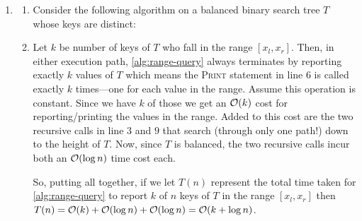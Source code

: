 \documentclass{article}
\begin{document}
\begin{enumerate}[leftmargin={*}, font={\bf}, label={\arabic*.}, ref={\arabic*}]
  \item \label{qst:3}
    \begin{enumerate}
      \item \label{qst:3a}
        Consider the following algorithm on a balanced binary search tree $T$ whose keys are distinct:
        \vspace{-\baselineskip}
        
        \begin{minipage}{\linewidth}
          \begin{algorithm}[H]
            \caption{$\textsc{Range-Query}(v,x_l,x_r)$}\label{alg:range-query}
            \begin{algorithmic}[1]
                  \State {} 
                \EndIf
                  \State {}
                \EndIf
                  \State {} 
                \EndIf
              \EndIf
            \end{algorithmic}
          \end{algorithm}
        \end{minipage}

      \item \label{qst:3b}
        Let $k$ be number of keys of $T$ who fall in the range $[x_l, x_r]$. Then, in either
        execution path, \autoref{alg:range-query} always terminates by reporting exactly $k$
        values of $T$ which means the \textsc{Print} statement in line $6$ is called exactly
        $k$ times---one for each value in the range. Assume this operation is constant. Since
        we have $k$ of those we get an $\operatorname*{\mathcal{O}}(k)$ cost for reporting/printing the values in the
        range. Added to this cost are the two recursive calls in line $3$ and $9$ that search
        (through only one path!) down to the height of $T$. Now, since $T$ is balanced, the
        two recursive calls incur both an $\operatorname*{\mathcal{O}}(\log n)$ time cost each.

        So, putting all together, if we let $T(n)$ represent the total time taken for
        \autoref{alg:range-query} to report $k$ of $n$ keys of $T$ in the range $[x_l, x_r]$
        then $T(n) = \operatorname*{\mathcal{O}}(k) + \operatorname*{\mathcal{O}}(\log n) + \operatorname*{\mathcal{O}}(\log n) = \operatorname*{\mathcal{O}}(k + \log n)$.
    \end{enumerate}


\end{enumerate}
\end{document}
